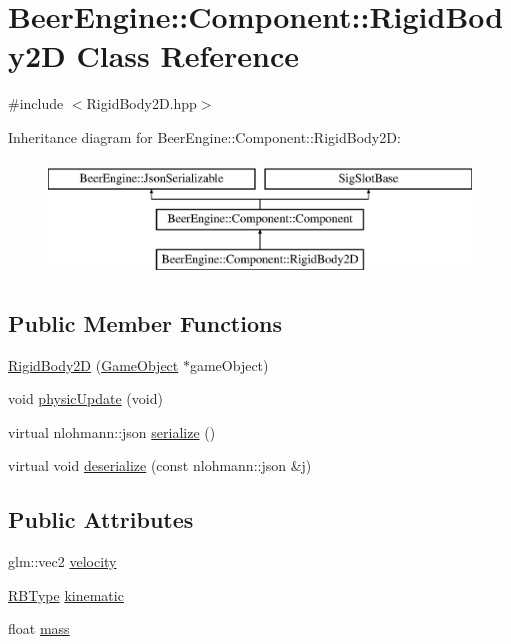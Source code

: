 \hypertarget{class_beer_engine_1_1_component_1_1_rigid_body2_d}{}\section{Beer\+Engine\+:\+:Component\+:\+:Rigid\+Body2D Class Reference}
\label{class_beer_engine_1_1_component_1_1_rigid_body2_d}


{\ttfamily \#include $<$Rigid\+Body2\+D.\+hpp$>$}

Inheritance diagram for Beer\+Engine\+:\+:Component\+:\+:Rigid\+Body2D\+:\begin{figure}[H]
\begin{center}
\leavevmode
\includegraphics[height=3.000000cm]{class_beer_engine_1_1_component_1_1_rigid_body2_d}
\end{center}
\end{figure}
\subsection*{Public Member Functions}
\begin{DoxyCompactItemize}
\item 
\mbox{\hyperlink{class_beer_engine_1_1_component_1_1_rigid_body2_d_a5f0d9faa4cd26f4628f9af1601868e3d}{Rigid\+Body2D}} (\mbox{\hyperlink{class_beer_engine_1_1_game_object}{Game\+Object}} $\ast$game\+Object)
\item 
void \mbox{\hyperlink{class_beer_engine_1_1_component_1_1_rigid_body2_d_ab452ad926f43ec0cb06ace5f187d8efd}{physic\+Update}} (void)
\item 
virtual nlohmann\+::json \mbox{\hyperlink{class_beer_engine_1_1_component_1_1_rigid_body2_d_afd6b6d4073e564a1c536243027bb8597}{serialize}} ()
\item 
virtual void \mbox{\hyperlink{class_beer_engine_1_1_component_1_1_rigid_body2_d_ae070289cdf3c6fde105671d41ee8315a}{deserialize}} (const nlohmann\+::json \&j)
\end{DoxyCompactItemize}
\subsection*{Public Attributes}
\begin{DoxyCompactItemize}
\item 
glm\+::vec2 \mbox{\hyperlink{class_beer_engine_1_1_component_1_1_rigid_body2_d_a485653f0ef04660b094871be32a6b0a7}{velocity}}
\item 
\mbox{\hyperlink{namespace_beer_engine_1_1_component_a2cfe279cc309b6420e792597940b8a33}{R\+B\+Type}} \mbox{\hyperlink{class_beer_engine_1_1_component_1_1_rigid_body2_d_a38906d52d817c362f4c9e226e21bf29f}{kinematic}}
\item 
float \mbox{\hyperlink{class_beer_engine_1_1_component_1_1_rigid_body2_d_a65249c4a9bb801725bfb4235e8d0f244}{mass}}
\end{DoxyCompactItemize}
